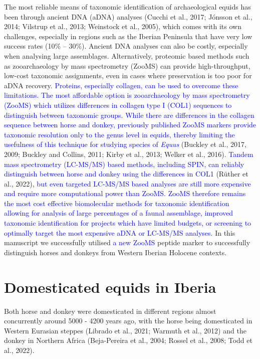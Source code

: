 \documentclass[preprint, 3p, authoryear]{elsarticle} %
\begin{document}
The most reliable means of taxonomic identification of archaeological equids has been through ancient DNA (aDNA) analyses (Cucchi et al., 2017; Jónsson et al., 2014; Vilstrup et al., 2013; Weinstock et al., 2005), which comes with its own challenges, especially in regions such as the Iberian Peninsula that have very low success rates (10\% -- 30\%). Ancient DNA analyses can also be costly, especially when analysing large assemblages. Alternatively, proteomic based methods such as zooarchaeology by mass spectrometry (ZooMS) can provide high-throughput, low-cost taxonomic assignments, even in cases where preservation is too poor for aDNA recovery. \textcolor{blue}{Proteins, especially collagen, can be used to overcome these limitations. The most affordable option is zooarchaeology by mass spectrometry (ZooMS) which utilizes differences in collagen type I (COL1) sequences to distinguish between taxonomic groups. While there are differences in the collagen sequence between horse and donkey, previously published ZooMS markers provide taxonomic resolution only to the genus level in equids, thereby limiting the usefulness of this technique for studying species of \emph{Equus}} (Buckley et al., 2017, 2009; Buckley and Collins, 2011; Kirby et al., 2013; Welker et al., 2016). \textcolor{blue}{Tandem mass spectrometry (LC-MS/MS) based methods, including SPIN, can reliably distinguish between horse and donkey using the differences in COL1} (Rüther et al., 2022), \textcolor{blue}{but even targeted LC-MS/MS based analyses are still more expensive and require more computational power than ZooMS. ZooMS therefore remains the most cost effective biomolecular methods for taxonomic identification allowing for analysis of large percentages of a faunal assemblage, improved taxonomic identification for projects which have limited budgets, or screening to optimally target the most expensive aDNA or LC-MS/MS analyses.} In this manuscript we successfully utilised \textcolor{blue}{a new ZooMS} peptide marker to successfully distinguish horses and donkeys from Western Iberian Holocene contexts.

\hypertarget{domesticated-equids-in-iberia}{%
\section{Domesticated equids in Iberia}\label{domesticated-equids-in-iberia}}

Both horse and donkey were domesticated in different regions almost concurrently around 5000 - 4200 years ago, with the horse being domesticated in Western Eurasian steppes (Librado et al., 2021; Warmuth et al., 2012) and the donkey in Northern Africa (Beja-Pereira et al., 2004; Rossel et al., 2008; Todd et al., 2022).
\end{document}
